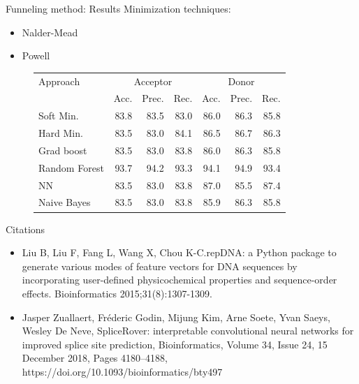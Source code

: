 \documentclass[10pt]{beamer}
\begin{document}
\begin{frame}{Funneling method: Results}
	Minimization techniques:
	\begin{itemize}
		\item Nalder-Mead
		\item Powell
	\end{itemize}
	\pause
	\begin{figure}
		\small
		\centering
		\begingroup
		\def\arraystretch{1.2}
		\begin{tabular}{|l|r|r|r|r|r|r|}
			\hline
			Approach  & \multicolumn{3}{c|}{Acceptor} & \multicolumn{3}{c|}{Donor} \\
			\cline{2-7}
			& Acc. & Prec. & Rec. & Acc. & Prec. & Rec. \\
			\hline
			Soft Min. & 83.8 & 83.5 & 83.0 & 86.0 & 86.3 & 85.8 \\
			Hard Min. & 83.5 & 83.0 & 84.1 & 86.5 & 86.7 & 86.3 \\
			\hline 
			\pause
			Grad boost & 83.5 & 83.0 & 83.8 & 86.0 & 86.3 & 85.8 \\
			Random Forest & 93.7 & 94.2 & 93.3 & 94.1 & 94.9 & 93.4 \\
			NN & 83.5 & 83.0 &83.8 & 87.0 & 85.5 & 87.4 \\
			Naive Bayes & 83.5 & 83.0 & 83.8 & 85.9 & 86.3 & 85.8 \\
			\hline
		\end{tabular}
		\endgroup
	\end{figure}
\end{frame}

\begin{frame}{Citations}
	\footnotesize
	\begin{itemize}
		\item Liu B, Liu F, Fang L, Wang X, Chou K-C.repDNA: a Python package to generate various modes of feature vectors for DNA sequences by incorporating user-defined physicochemical properties and sequence-order effects. Bioinformatics 2015;31(8):1307-1309.
		\item Jasper Zuallaert, Fréderic Godin, Mijung Kim, Arne Soete, Yvan Saeys, Wesley De Neve, SpliceRover: interpretable convolutional neural networks for improved splice site prediction, Bioinformatics, Volume 34, Issue 24, 15 December 2018, Pages 4180–4188, https://doi.org/10.1093/bioinformatics/bty497
	\end{itemize}
\end{frame}
\end{document}
